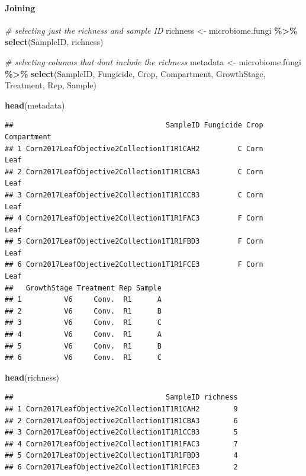 \documentclass[
]{article}
\newenvironment{Shaded}{\begin{snugshade}}{\end{snugshade}}
\newcommand{\CommentTok}[1]{\textcolor[rgb]{0.56,0.35,0.01}{\textit{#1}}}
\newcommand{\FunctionTok}[1]{\textcolor[rgb]{0.13,0.29,0.53}{\textbf{#1}}}
\newcommand{\NormalTok}[1]{#1}
\newcommand{\OtherTok}[1]{\textcolor[rgb]{0.56,0.35,0.01}{#1}}
\newcommand{\SpecialCharTok}[1]{\textcolor[rgb]{0.81,0.36,0.00}{\textbf{#1}}}
\begin{document}
\paragraph{Joining}\label{joining}

\begin{Shaded}
\begin{Highlighting}[]
\CommentTok{\# selecting just the richness and sample ID}
\NormalTok{richness }\OtherTok{\textless{}{-}}\NormalTok{ microbiome.fungi }\SpecialCharTok{\%\textgreater{}\%}
  \FunctionTok{select}\NormalTok{(SampleID, richness)}

\CommentTok{\# selecting columns that don\textquotesingle{}t include the richness}
\NormalTok{metadata }\OtherTok{\textless{}{-}}\NormalTok{ microbiome.fungi }\SpecialCharTok{\%\textgreater{}\%} 
  \FunctionTok{select}\NormalTok{(SampleID, Fungicide, Crop, Compartment, GrowthStage, Treatment, Rep, Sample)}

\FunctionTok{head}\NormalTok{(metadata)}
\end{Highlighting}
\end{Shaded}

\begin{verbatim}
##                                    SampleID Fungicide Crop Compartment
## 1 Corn2017LeafObjective2Collection1T1R1CAH2         C Corn        Leaf
## 2 Corn2017LeafObjective2Collection1T1R1CBA3         C Corn        Leaf
## 3 Corn2017LeafObjective2Collection1T1R1CCB3         C Corn        Leaf
## 4 Corn2017LeafObjective2Collection1T1R1FAC3         F Corn        Leaf
## 5 Corn2017LeafObjective2Collection1T1R1FBD3         F Corn        Leaf
## 6 Corn2017LeafObjective2Collection1T1R1FCE3         F Corn        Leaf
##   GrowthStage Treatment Rep Sample
## 1          V6     Conv.  R1      A
## 2          V6     Conv.  R1      B
## 3          V6     Conv.  R1      C
## 4          V6     Conv.  R1      A
## 5          V6     Conv.  R1      B
## 6          V6     Conv.  R1      C
\end{verbatim}

\begin{Shaded}
\begin{Highlighting}[]
\FunctionTok{head}\NormalTok{(richness)}
\end{Highlighting}
\end{Shaded}

\begin{verbatim}
##                                    SampleID richness
## 1 Corn2017LeafObjective2Collection1T1R1CAH2        9
## 2 Corn2017LeafObjective2Collection1T1R1CBA3        6
## 3 Corn2017LeafObjective2Collection1T1R1CCB3        5
## 4 Corn2017LeafObjective2Collection1T1R1FAC3        7
## 5 Corn2017LeafObjective2Collection1T1R1FBD3        4
## 6 Corn2017LeafObjective2Collection1T1R1FCE3        2
\end{verbatim}
\end{document}
